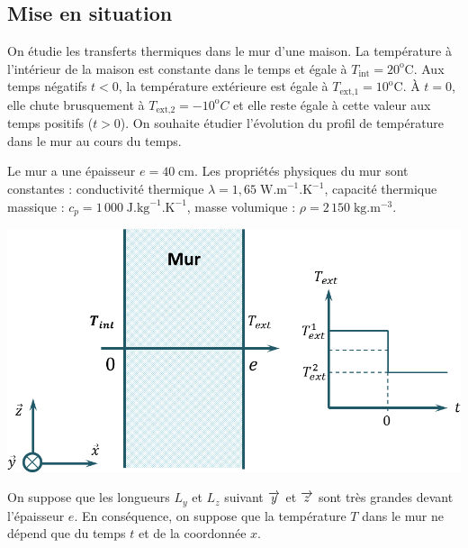 \documentclass[10pt,fleqn]{article} %
\begin{document}

\vspace{4cm}
\pagestyle{fancy}
\thispagestyle{plain}


\def\columnseprulecolor{\color{ocre}}
\setlength{\columnseprule}{0.4pt} 
\ifprof
\begin{multicols}{2}
\else
\begin{multicols}{2}
\fi



\section*{Mise en situation}

On étudie les transferts thermiques dans le mur d’une maison. La température à
l'intérieur de la maison est constante dans le temps et égale à $T_{\text{int}}=20^{\text{o}} \text{C}$. Aux temps négatifs $t<0$, la température extérieure est égale à $T_{\text{ext,1}}=10^{\text{o}} \text{C}$. À $t=0$, elle chute brusquement à $T_{\text{ext,2}}=-10^{\text{o}} C$ et elle reste égale à cette valeur aux temps positifs ($t>0$). On
souhaite étudier l'évolution du profil de température dans le mur au cours du temps.

Le mur a une épaisseur $e=40\;\text{cm}$. Les propriétés physiques du mur sont constantes : conductivité thermique $\lambda = 1,65\; \text{W.m}^{-1}.\text{K}^{-1}$, capacité thermique massique : $c_p = 1\, 000\; \text{J}.\text{kg}^{-1}.\text{K}^{-1}$, masse volumique : $\rho = 2\, 150 \; \text{kg}.\text{m}^{-3}$. 


\begin{center}
\includegraphics[width=\linewidth]{images/figure_01}
\end{center}



On suppose que les longueurs $L_y$ et $L_z$ suivant $\overrightarrow{y}$ et $\overrightarrow{z}$ sont très grandes devant l'épaisseur $e$. En conséquence, on suppose que la température $T$ dans le mur ne dépend que du temps $t$ et de la coordonnée $x$. 


\end{multicols}
\end{multicols}
\end{document}
